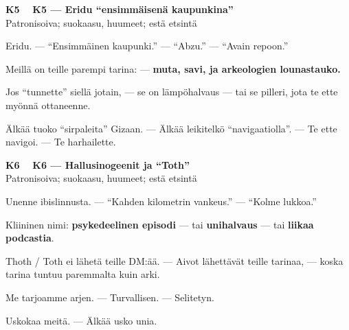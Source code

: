 \documentclass[a4paper,11pt]{article}
\begin{document}
\filbreak
\vspace{0.9mm}
\noindent
\begin{tcolorbox}[
  colframe=eaglecol,
  colback=white,
  boxrule=0.8pt,
  arc=0pt,
  outer arc=0pt,
  left=2.5mm, right=2.5mm, top=2mm, bottom=2mm,
  boxsep=0.5mm,
  sharp corners,
  enhanced,
  breakable=false
]
{\large\ttfamily\bfseries K5}~~
{\normalsize\bfseries K5 --- Eridu ``ensimmäisenä kaupunkina''}\\[0.2em]
{\small\color{black!65} Patronisoiva; suokaasu, huumeet; estä etsintä}\\[0.35em]
{\normalsize\raggedright Eridu. --- ``Ensimmäinen kaupunki.'' --- ``Abzu.'' --- ``Avain repoon.''

Meillä on teille parempi tarina: --- \textbf{muta, savi, ja arkeologien lounastauko.}

Jos ``tunnette'' siellä jotain, --- se on lämpöhalvaus --- tai se pilleri, jota te ette myönnä ottaneenne.

Älkää tuoko ``sirpaleita'' Gizaan. --- Älkää leikitelkö ``navigaatiolla''. --- Te ette navigoi. --- Te harhailette.}
\end{tcolorbox}

\filbreak
\vspace{0.9mm}
\noindent
\begin{tcolorbox}[
  colframe=eaglecol,
  colback=white,
  boxrule=0.8pt,
  arc=0pt,
  outer arc=0pt,
  left=2.5mm, right=2.5mm, top=2mm, bottom=2mm,
  boxsep=0.5mm,
  sharp corners,
  enhanced,
  breakable=false
]
{\large\ttfamily\bfseries K6}~~
{\normalsize\bfseries K6 --- Hallusinogeenit ja ``Toth''}\\[0.2em]
{\small\color{black!65} Patronisoiva; suokaasu, huumeet; estä etsintä}\\[0.35em]
{\normalsize\raggedright Unenne ibislinnusta. --- ``Kahden kilometrin vankeus.'' --- ``Kolme lukkoa.''

Kliininen nimi: \textbf{psykedeelinen episodi} --- tai \textbf{unihalvaus} --- tai \textbf{liikaa podcastia}.

Thoth / Toth ei lähetä teille DM:ää. --- Aivot lähettävät teille tarinaa, --- koska tarina tuntuu paremmalta kuin arki.

Me tarjoamme arjen. --- Turvallisen. --- Selitetyn.

Uskokaa meitä. --- Älkää usko unia.}
\end{tcolorbox}
\end{document}

